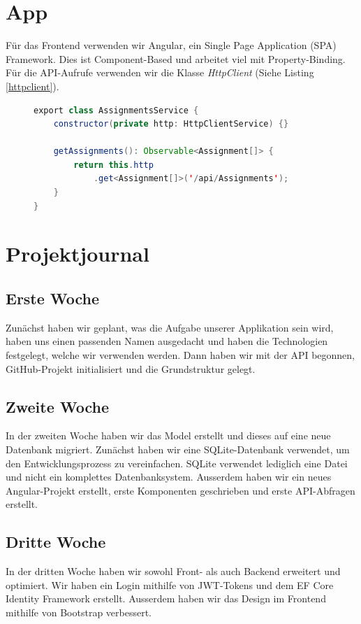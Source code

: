 \documentclass[a4paper, titlepage]{article}
\begin{document}
    \section{App}
    Für das Frontend verwenden wir Angular, ein Single Page Application (SPA) Framework. Dies ist Component-Based
    und arbeitet viel mit Property-Binding. Für die API-Aufrufe verwenden wir die Klasse \emph{HttpClient} (Siehe 
    Listing \ref{httpclient}).

    \begin{figure}
        
    \begin{lstlisting}[language=java,caption=HttpClient, label=httpclient]
export class AssignmentsService {
    constructor(private http: HttpClientService) {}
    
    getAssignments(): Observable<Assignment[]> {
        return this.http
            .get<Assignment[]>('/api/Assignments');
    }
} 

    \end{lstlisting}
    \end{figure}

    \section{Projektjournal}
    \subsection{Erste Woche}
    Zunächst haben wir geplant, was die Aufgabe unserer Applikation sein wird, haben uns einen passenden Namen ausgedacht und
    haben die Technologien festgelegt, welche wir verwenden werden. Dann haben wir mit der API begonnen, GitHub-Projekt initialisiert
    und die Grundstruktur gelegt.
    \subsection{Zweite Woche}
    In der zweiten Woche haben wir das Model erstellt und dieses auf eine neue Datenbank migriert. Zunächst haben wir eine SQLite-Datenbank
    verwendet, um den Entwicklungsprozess zu vereinfachen. SQLite verwendet lediglich eine Datei und nicht ein komplettes Datenbanksystem.
    Ausserdem haben wir ein neues Angular-Projekt erstellt, erste Komponenten geschrieben und erste API-Abfragen erstellt.
    \subsection{Dritte Woche}
    In der dritten Woche haben wir sowohl Front- als auch Backend erweitert und optimiert. Wir haben ein Login mithilfe von JWT-Tokens und dem EF Core
    Identity Framework erstellt. Ausserdem haben wir das Design im Frontend mithilfe von Bootstrap verbessert.
\end{document}
